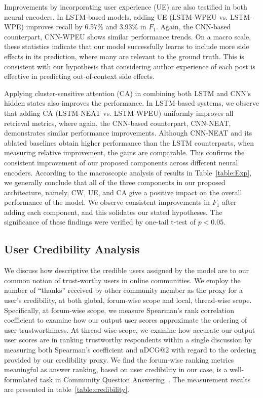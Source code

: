 \documentclass{bmcart}
\begin{document}
Improvements by incorporating user experience (UE) are 
also testified in both neural encoders. In LSTM-based models, adding UE (LSTM-WPEU vs. LSTM-WPE) improves recall
by 6.57\% and 3.93\% in $F_1$.  Again, the CNN-based counterpart, CNN-WPEU shows similar performance trends.  On a macro scale, these statistics indicate 
that our model successfully learns to include more side effects in its prediction,
where many are relevant to the ground truth.  This is consistent with
our hypothesis that considering author experience of each post is effective in predicting out-of-context side effects.

Applying cluster-sensitive attention (CA) in combining both LSTM and CNN's
hidden states also improves the performance. In LSTM-based systems, we observe 
that adding CA (LSTM-NEAT vs. LSTM-WPEU) uniformly improves all retrieval metrics, where again, the CNN-based counterpart,
CNN-NEAT, demonstrates similar performance improvements. Although CNN-NEAT and its ablated baselines obtain higher performance than the LSTM counterparts, when measuring relative improvement, the gains are comparable. This confirms the consistent improvement of our proposed components across different neural encoders. According to the macroscopic analysis of results in
Table~\ref{table:Exp}, we generally conclude that all of the three components in
our proposed architecture, namely, CW, UE, and
CA give a positive impact on the overall performance of the
model. We observe consistent improvements in $F_1$ after adding each component, and this solidates our stated hypotheses. The significance of these findings were verified by one-tail t-test of $p < 0.05$. \\

\subsection{User Credibility Analysis}
We discuss how descriptive the credible users assigned by the model are to our common notion of trust-worthy users in online communities. 
We employ the number of ``thanks'' received by other community member as the proxy for a user's credibility, at both global, forum-wise scope and local, thread-wise scope. Specifically, at forum-wise scope, we measure Spearman's rank correlation coefficient to examine how our output user scores approximate the ordering of user trustworthiness.
At thread-wise scope, we examine how accurate our output user scores are in ranking trustworthy respondents within a single discussion by measuring both Spearman's coefficient and nDCG@2 with regard to the ordering provided by our credibility proxy. We find the forum-wise ranking metrics meaningful as answer ranking, based on user credibility in our case, is a well-formulated task in Community Question Answering~\cite{nie2017data, surdeanu2008learning,nakov2016semeval}. The measurement results are presented in table~\ref{table:credibility}. 
\end{document}

